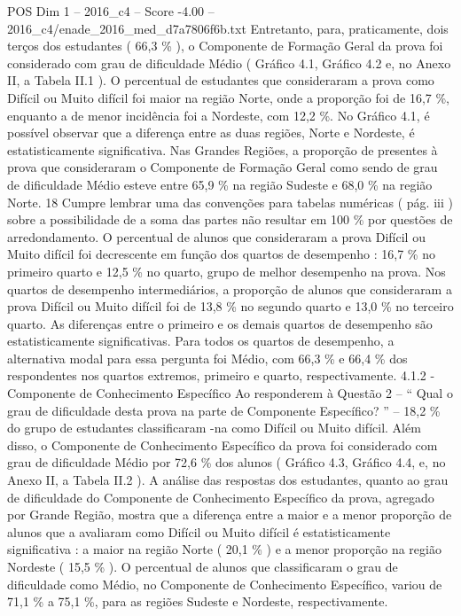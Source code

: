 \begin{textsample}{POS Dim 1 – 2016\_c4 – Score -4.00 – 2016\_c4/enade\_2016\_med\_d7a7806f6b.txt}
Entretanto, para, praticamente, dois terços dos estudantes ( 66,3 \% ), o Componente de Formação Geral da prova foi considerado com grau de dificuldade Médio ( Gráfico 4.1, Gráfico 4.2 e, no Anexo II, a Tabela II.1 ).
O percentual de estudantes que consideraram a prova como Difícil ou Muito difícil foi maior na região Norte, onde a proporção foi de 16,7 \%, enquanto a de menor incidência foi a Nordeste, com 12,2 \%.
No Gráfico 4.1, é possível observar que a diferença entre as duas regiões, Norte e Nordeste, é estatisticamente significativa.
Nas Grandes Regiões, a proporção de presentes à prova que consideraram o Componente de Formação Geral como sendo de grau de dificuldade Médio esteve entre 65,9 \% na região Sudeste e 68,0 \% na região Norte. 18 Cumpre lembrar uma das convenções para tabelas numéricas ( pág. iii ) sobre a possibilidade de a soma das partes não resultar em 100 \% por questões de arredondamento.
O percentual de alunos que consideraram a prova Difícil ou Muito difícil foi decrescente em função dos quartos de desempenho : 16,7 \% no primeiro quarto e 12,5 \% no quarto, grupo de melhor desempenho na prova.
Nos quartos de desempenho intermediários, a proporção de alunos que consideraram a prova Difícil ou Muito difícil foi de 13,8 \% no segundo quarto e 13,0 \% no terceiro quarto.
As diferenças entre o primeiro e os demais quartos de desempenho são estatisticamente significativas.
Para todos os quartos de desempenho, a alternativa modal para essa pergunta foi Médio, com 66,3 \% e 66,4 \% dos respondentes nos quartos extremos, primeiro e quarto, respectivamente. 4.1.2 - Componente de Conhecimento Específico Ao responderem à Questão 2 – “ Qual o grau de dificuldade desta prova na parte de Componente Específico? ” – 18,2 \% do grupo de estudantes classificaram -na como Difícil ou Muito difícil.
Além disso, o Componente de Conhecimento Específico da prova foi considerado com grau de dificuldade Médio por 72,6 \% dos alunos ( Gráfico 4.3, Gráfico 4.4, e, no Anexo II, a Tabela II.2 ).
A análise das respostas dos estudantes, quanto ao grau de dificuldade do Componente de Conhecimento Específico da prova, agregado por Grande Região, mostra que a diferença entre a maior e a menor proporção de alunos que a avaliaram como Difícil ou Muito difícil é estatisticamente significativa : a maior na região Norte ( 20,1 \% ) e a menor proporção na região Nordeste ( 15,5 \% ).
O percentual de alunos que classificaram o grau de dificuldade como Médio, no Componente de Conhecimento Específico, variou de 71,1 \% a 75,1 \%, para as regiões Sudeste e Nordeste, respectivamente.

\end{textsample}
